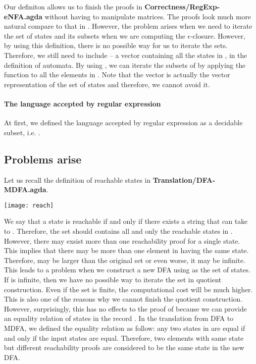 \par Our definiton allows us to finish the proofs in
\textbf{Correctness/RegExp-eNFA.agda} without having to
manipulate matrices. The proofs look much more natural compare to that in
\cite{firsov2013}. However, the problem arises when we need to iterate the set of states
and its subsets when we are computing the
\(\epsilon\)-closure. However, by using this definition, there is no possible way
for us to iterate the sets. Therefore, we still need to include  -- a
vector containing all the states in , in the definition of automata. By
using , we can iterate the subsets of  by applying the
function  to all the elements in . Note that the
vector  is actually the vector representation of the set of
states and therefore, we cannot avoid it. 

\paragraph{The language accepted by regular expression} At first, we
defined the language accepted by regular expression as a decidable
subset, i.e. . 

\subsection{Problems arise}
\par Let us recall the definition of reachable states in
\textbf{Translation/DFA-MDFA.agda}. 

\begin{center} \texttt{[image: reach]} \end{center}

\par We say that a state  is reachable if and
only if there exists a string  that can take  to
. Therefore, the set  should contains all and only the
reachable states in . However, there may exsist more than one
reachability proof for a single state. This implies that there may be
more than one element in  having the same state. Therefore, 
may be larger than the original set  or even worse, it may be
infinite. This leads to a problem when we construct a
new DFA using  as the set of states. If  is
infinite, then we have no possible way to iterate the set in 
quotient construction. Even if the set  is finite, the
computational cost will be much higher. This is also one of the
reasons why we cannot finish the quotient construction. However,
surprisingly, this has no effects to the proof of  because we can provide an equality relation of states in
the record . In the translation from DFA to MDFA, we defined
the equality relation as follow: any two states in  are equal if and only
if the input states are equal. Therefore, two elements with same state
but different reachability proofs are considered to be the same state
in the new DFA. 

